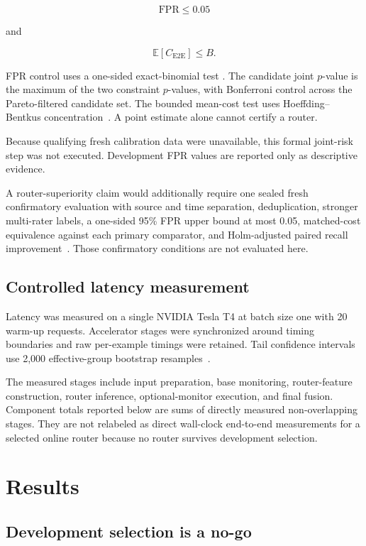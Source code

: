 \documentclass[11pt]{article}
\begin{document}
\[
\mathrm{FPR}\leq 0.05
\]

and

\[
\mathbb{E}
[
C_{\mathrm{E2E}}
]
\leq B.
\]

FPR control uses a one-sided exact-binomial test
\cite{clopper1934}. The candidate joint \(p\)-value is the maximum of the two
constraint \(p\)-values, with Bonferroni control across the
Pareto-filtered candidate set. The bounded mean-cost test uses
Hoeffding--Bentkus concentration~\cite{hoeffding1963,bentkus2004}. A point estimate alone cannot certify
a router.

Because qualifying fresh calibration data were unavailable, this
formal joint-risk step was not executed. Development FPR values are
reported only as descriptive evidence.

A router-superiority claim would additionally require one sealed
fresh confirmatory evaluation with source and time separation,
deduplication, stronger multi-rater labels, a one-sided 95\% FPR
upper bound at most 0.05, matched-cost equivalence against each
primary comparator, and Holm-adjusted paired recall
improvement~\cite{holm1979}. Those confirmatory conditions are not evaluated here.

\subsection{Controlled latency measurement}

Latency was measured on a single NVIDIA Tesla T4 at batch size one
with 20 warm-up requests. Accelerator stages were synchronized
around timing boundaries and raw per-example timings were retained.
Tail confidence intervals use 2,000 effective-group bootstrap
resamples~\cite{efron1979}.

The measured stages include input preparation, base monitoring,
router-feature construction, router inference, optional-monitor
execution, and final fusion. Component totals reported below are
sums of directly measured non-overlapping stages. They are not
relabeled as direct wall-clock end-to-end measurements for a
selected online router because no router survives development
selection.

\section{Results}

\subsection{Development selection is a no-go}
\end{document}
